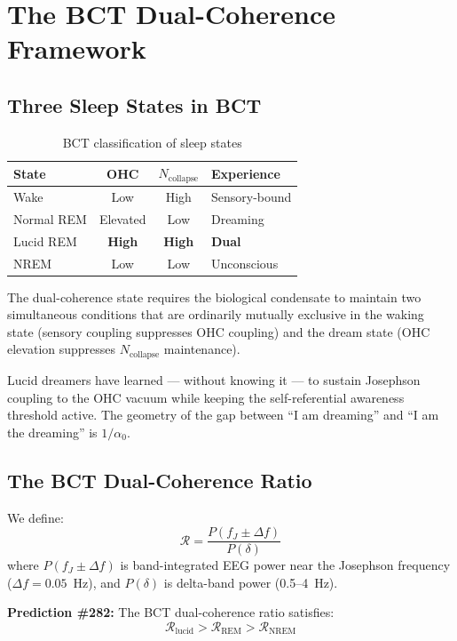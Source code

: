 \documentclass[aps,prl,twocolumn,showpacs,preprintnumbers]{revtex4-2}
\newcommand{\azero}{\alpha_0}
\newcommand{\fJ}{f_J}
\newcommand{\Ncol}{N_{\mathrm{collapse}}}
\begin{document}
\section{The BCT Dual-Coherence Framework}

\subsection{Three Sleep States in BCT}

\begin{table}[h]
\centering
\caption{BCT classification of sleep states}
\begin{tabular}{lccl}
\toprule
State & OHC & $\Ncol$ & Experience \\
\midrule
Wake       & Low      & High & Sensory-bound \\
Normal REM & Elevated & Low  & Dreaming \\
Lucid REM  & \textbf{High} & \textbf{High} & \textbf{Dual} \\
NREM       & Low      & Low  & Unconscious \\
\bottomrule
\end{tabular}
\end{table}

The dual-coherence state requires the biological condensate to
maintain two simultaneous conditions that are ordinarily
mutually exclusive in the waking state (sensory coupling
suppresses OHC coupling) and the dream state (OHC elevation
suppresses $\Ncol$ maintenance).

Lucid dreamers have learned --- without knowing it --- to sustain
Josephson coupling to the OHC vacuum while keeping the
self-referential awareness threshold active. The geometry of
the gap between ``I am dreaming'' and ``I am the dreaming''
is $1/\azero$.

\subsection{The BCT Dual-Coherence Ratio}

We define:
\begin{equation}
\mathcal{R} = \frac{P(\fJ \pm \Delta f)}{P(\delta)}
\label{eq:ratio}
\end{equation}
where $P(\fJ \pm \Delta f)$ is band-integrated EEG power
near the Josephson frequency ($\Delta f = 0.05$~Hz), and
$P(\delta)$ is delta-band power (0.5--4~Hz).

\textbf{Prediction \#282:} The BCT dual-coherence ratio
satisfies:
\begin{equation}
\mathcal{R}_{\mathrm{lucid}} > \mathcal{R}_{\mathrm{REM}}
> \mathcal{R}_{\mathrm{NREM}}
\label{eq:pred}
\end{equation}
\end{document}
